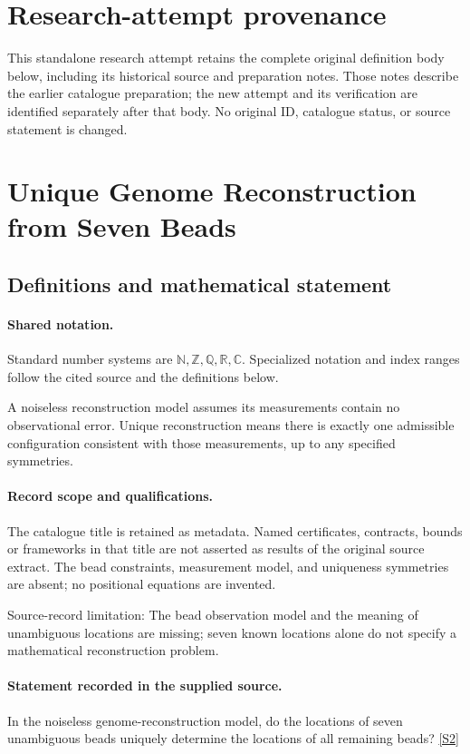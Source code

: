 \documentclass[11pt]{article}
\begin{document}
\section*{Research-attempt provenance}
This standalone research attempt retains the complete original definition body below,
including its historical source and preparation notes. Those notes describe the
earlier catalogue preparation; the new attempt and its verification are identified
separately after that body. No original ID, catalogue status, or source statement is changed.

\section{Unique Genome Reconstruction from Seven Beads}\label{statement}

\subsection{Definitions and mathematical statement}

\paragraph{Shared notation.}Standard number systems are $\mathbb N,\mathbb Z,\mathbb Q,\mathbb R,\mathbb C$. Specialized notation and index ranges follow the cited source and the definitions below.


A noiseless reconstruction model assumes its measurements contain no observational error. Unique reconstruction means there is exactly one admissible configuration consistent with those measurements, up to any specified symmetries.
\paragraph{Record scope and qualifications.}
The catalogue title is retained as metadata. Named certificates, contracts, bounds or frameworks in that title are not asserted as results of the original source extract.
The bead constraints, measurement model, and uniqueness symmetries are absent; no positional equations are invented.

Source-record limitation: The bead observation model and the meaning of unambiguous locations are missing; seven known locations alone do not specify a mathematical reconstruction problem.
\paragraph{Statement recorded in the supplied source.}
In the noiseless genome-reconstruction model, do the locations of seven unambiguous beads uniquely determine the locations of all remaining beads? \href{https://doi.org/10.4171/owr/2022/55}{[S2]}
\end{document}
